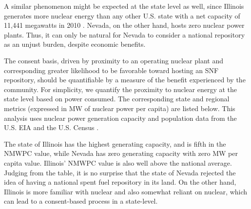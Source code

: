 A similar phenomenon might be expected at the state level as well, since 
Illinois generates more nuclear energy than any other U.S.  state with a net 
capacity of 11,441 megawatts in 2010 \cite{eia_state_2012}. Nevada, on the other 
hand, hosts zero nuclear power plants. Thus, it can only be natural for Nevada 
to consider a national repository as an unjust burden, despite economic 
benefits.  

The consent basis, driven by proximity to an operating nuclear plant and 
corresponding greater likelihood to be favorable toward hosting an \gls{SNF} 
repository, should be quantifiable by a measure of the benefit experienced by 
the community.  For simplicity, we quantify the proximity to nuclear energy at 
the state level  based on power consumed. The corresponding state and regional 
metrics (expressed in MW of nuclear power per capita) are listed below. This 
analysis uses nuclear power generation capacity and population data from the 
U.S. \gls{EIA} \cite{eia_state_2012} and the U.S. Census \cite{census}.  

\begin{table}[h]
	
	\centering
	\caption {\gls{NMWPC} values for different states}

	\end{table}
	
	
The state of Illinois has the highest generating capacity, and is fifth in the \gls{NMWPC}
 value, while Nevada has zero generating capacity with zero MW per capita value. 
Illinois' \gls{NMWPC} value is also well above the national average. Judging from the
table, it is no surprise that the state of Nevada rejected the idea of having a national
spent fuel repository in its land. On the other hand, Illinois is more familiar with 
nuclear and also somewhat reliant on nuclear, which can lead to a consent-based process
in a state-level. 

